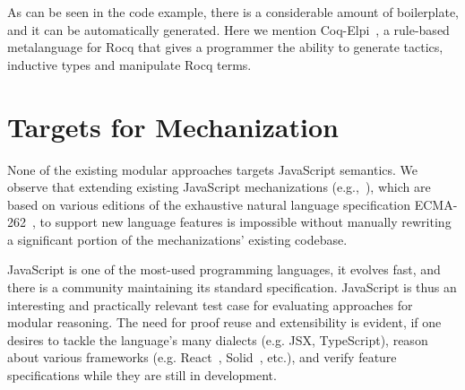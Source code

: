 \documentclass[sigplan,nonacm,review]{acmart}
\begin{document}
As can be seen in the code example,
there is a considerable amount of boilerplate,
and it can be automatically generated.
Here we mention Coq-Elpi~\cite{tassi2025elpi}, a rule-based metalanguage for Rocq that
gives a programmer the ability to generate tactics,
inductive types and manipulate Rocq terms.



\section{Targets for Mechanization}


None of the existing modular approaches targets JavaScript semantics.
We observe that extending existing JavaScript mechanizations (e.g.,~\cite{guha2010essence,bodin2014trusted}), which are based on various editions of the exhaustive natural language specification ECMA-262~\cite{ECMA},
to support new language features
is impossible without manually rewriting a significant portion of the mechanizations' existing codebase.


JavaScript is one of the most-used programming languages, it evolves fast, and there is a community maintaining its standard specification. 
JavaScript is thus an interesting and practically relevant test case for evaluating approaches for modular reasoning. The need for proof reuse and extensibility is evident, if one desires to tackle the language's many dialects (e.g. JSX, TypeScript), reason about various frameworks (e.g. React~\cite{React}, Solid~\cite{Solid}, etc.), and verify feature specifications while they are still in development. 
\end{document}
